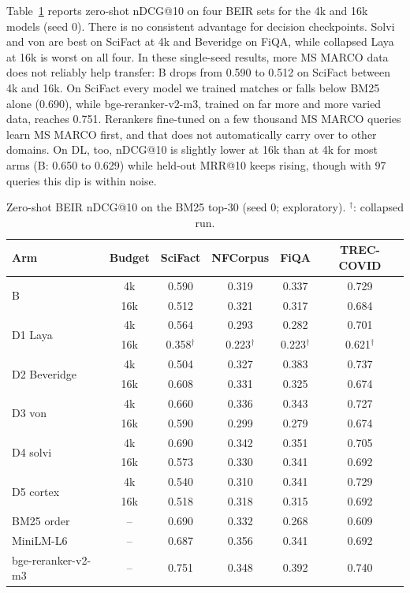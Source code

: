 \documentclass[journal]{IEEEtran}
\makeatletter
\newcommand{\ms}{MRR@10}
\newcommand{\nd}{nDCG@10}
\newcommand{\fl}{$^{\dagger}$}
\makeatother
\begin{document}
Table~\ref{tab:beir} reports zero-shot \nd{} on four BEIR sets for the 4k and 16k models (seed 0). There is no consistent advantage for decision checkpoints. Solvi and von are best on SciFact at 4k and Beveridge on FiQA, while collapsed Laya at 16k is worst on all four. In these single-seed results, more MS MARCO data does not reliably help transfer: B drops from 0.590 to 0.512 on SciFact between 4k and 16k. On SciFact every model we trained matches or falls below BM25 alone (0.690), while bge-reranker-v2-m3, trained on far more and more varied data, reaches 0.751. Rerankers fine-tuned on a few thousand MS MARCO queries learn MS MARCO first, and that does not automatically carry over to other domains. On DL, too, \nd{} is slightly lower at 16k than at 4k for most arms (B: 0.650 to 0.629) while held-out \ms{} keeps rising, though with 97 queries this dip is within noise.

\begin{table}[t]
\centering
\caption{Zero-shot BEIR \nd{} on the BM25 top-30 (seed 0; exploratory). \fl{}: collapsed run.}
\label{tab:beir}
\setlength{\tabcolsep}{3.5pt}
\begin{tabular}{@{}l c cccc@{}}
\toprule
Arm & Budget & SciFact & NFCorpus & FiQA & TREC-COVID \\
\midrule
\multirow{2}{*}{B} & 4k & 0.590 & 0.319 & 0.337 & 0.729 \\
 & 16k & 0.512 & 0.321 & 0.317 & 0.684 \\
\multirow{2}{*}{D1 Laya} & 4k & 0.564 & 0.293 & 0.282 & 0.701 \\
 & 16k & 0.358\fl & 0.223\fl & 0.223\fl & 0.621\fl \\
\multirow{2}{*}{D2 Beveridge} & 4k & 0.504 & 0.327 & 0.383 & 0.737 \\
 & 16k & 0.608 & 0.331 & 0.325 & 0.674 \\
\multirow{2}{*}{D3 von} & 4k & 0.660 & 0.336 & 0.343 & 0.727 \\
 & 16k & 0.590 & 0.299 & 0.279 & 0.674 \\
\multirow{2}{*}{D4 solvi} & 4k & 0.690 & 0.342 & 0.351 & 0.705 \\
 & 16k & 0.573 & 0.330 & 0.341 & 0.692 \\
\multirow{2}{*}{D5 cortex} & 4k & 0.540 & 0.310 & 0.341 & 0.729 \\
 & 16k & 0.518 & 0.318 & 0.315 & 0.692 \\
\midrule
BM25 order & -- & 0.690 & 0.332 & 0.268 & 0.609 \\
MiniLM-L6 & -- & 0.687 & 0.356 & 0.341 & 0.692 \\
bge-reranker-v2-m3 & -- & 0.751 & 0.348 & 0.392 & 0.740 \\
\bottomrule
\end{tabular}
\end{table}
\end{document}

